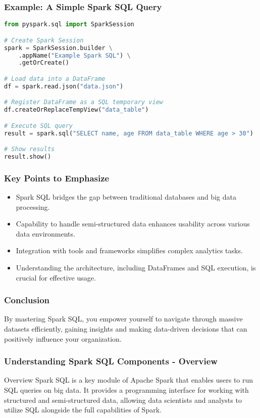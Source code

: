 \documentclass[aspectratio=169]{beamer}
\begin{document}
\begin{frame}[fragile]
    \frametitle{Example: A Simple Spark SQL Query}
    \begin{lstlisting}[language=python]
from pyspark.sql import SparkSession

# Create Spark Session
spark = SparkSession.builder \
    .appName("Example Spark SQL") \
    .getOrCreate()

# Load data into a DataFrame
df = spark.read.json("data.json")

# Register DataFrame as a SQL temporary view
df.createOrReplaceTempView("data_table")

# Execute SQL query
result = spark.sql("SELECT name, age FROM data_table WHERE age > 30")

# Show results
result.show()
    \end{lstlisting}
\end{frame}

\begin{frame}[fragile]
    \frametitle{Key Points to Emphasize}
    \begin{itemize}
        \item Spark SQL bridges the gap between traditional databases and big data processing.
        \item Capability to handle semi-structured data enhances usability across various data environments.
        \item Integration with tools and frameworks simplifies complex analytics tasks.
        \item Understanding the architecture, including DataFrames and SQL execution, is crucial for effective usage.
    \end{itemize}
\end{frame}

\begin{frame}[fragile]
    \frametitle{Conclusion}
    By mastering Spark SQL, you empower yourself to navigate through massive datasets efficiently, gaining insights and making data-driven decisions that can positively influence your organization.
\end{frame}

\begin{frame}[fragile]
    \frametitle{Understanding Spark SQL Components - Overview}
    \begin{block}{Overview}
        Spark SQL is a key module of Apache Spark that enables users to run SQL queries on big data. 
        It provides a programming interface for working with structured and semi-structured data, allowing 
        data scientists and analysts to utilize SQL alongside the full capabilities of Spark.
    \end{block}
\end{frame}
\end{document}
